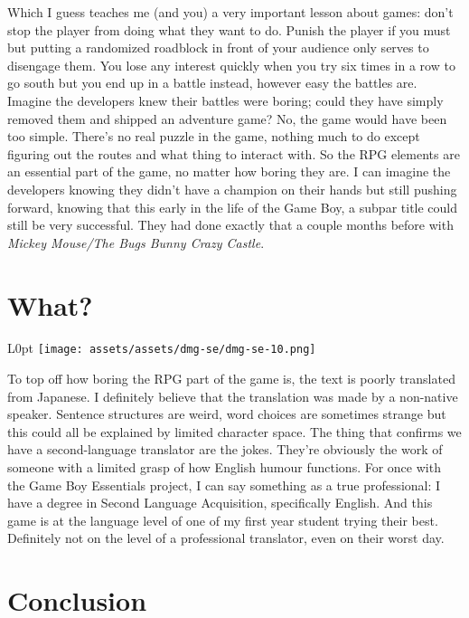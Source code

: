 \documentclass{book}
\begin{document}
Which I guess teaches me (and you) a very important lesson about games: don’t stop the player from doing what they want to do. Punish the player if you must but putting a randomized roadblock in front of your audience only serves to disengage them. You lose any interest quickly when you try six times in a row to go south but you end up in a battle instead, however easy the battles are. Imagine the developers knew their battles were boring; could they have simply removed them and shipped an adventure game? No, the game would have been too simple. There’s no real puzzle in the game, nothing much to do except figuring out the routes and what thing to interact with. So the RPG elements are an essential part of the game, no matter how boring they are. I can imagine the developers knowing they didn’t have a champion on their hands but still pushing forward, knowing that this early in the life of the Game Boy, a subpar title could still be very successful. They had done exactly that a couple months before with \emph{Mickey Mouse/The Bugs Bunny Crazy Castle}.

\FloatBarrier\needspace{5pt}\section*{What?}\nopagebreak[4]

\begin{wrapfigure}{L}{0pt} \texttt{[image: assets/assets/dmg-se/dmg-se-10.png]}\end{wrapfigure}
To top off how boring the RPG part of the game is, the text is poorly translated from Japanese. I definitely believe that the translation was made by a non-native speaker. Sentence structures are weird, word choices are sometimes strange but this could all be explained by limited character space. The thing that confirms we have a second-language translator are the jokes. They’re obviously the work of someone with a limited grasp of how English humour functions. For once with the Game Boy Essentials project, I can say something as a true professional: I have a degree in Second Language Acquisition, specifically English. And this game is at the language level of one of my first year student trying their best. Definitely not on the level of a professional translator, even on their worst day.

\FloatBarrier\needspace{5pt}\section*{Conclusion}\nopagebreak[4]
\end{document}
